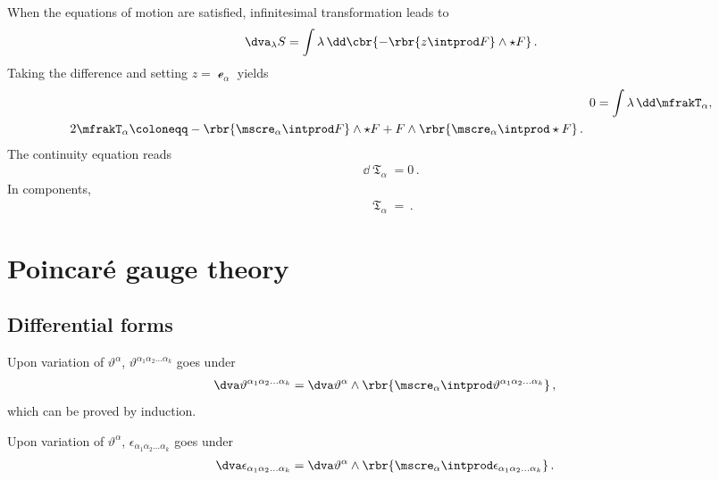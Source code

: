 \documentclass[a4paper]{article}
\begin{document}
When the equations of motion are satisfied, infinitesimal 
transformation leads to
\begin{align}
\dva_{\lambda} S = \int \lambda\,\dd\cbr{-\rbr{z\intprod F}\wedge\star F}\,.
\end{align}
Taking the difference and setting $z = \mscre_{\alpha}$ yields
\begin{align}
0 &= \int \lambda\,\dd \mfrakT_{\alpha}, \\
\begin{split}
2 \mfrakT_{\alpha} &\coloneqq -\rbr{\mscre_{\alpha}\intprod F}\wedge\star F +
	F \wedge\rbr{\mscre_{\alpha}\intprod\star F}\,.
\end{split}
\end{align}
The continuity equation reads
\begin{align}
\dd \mfrakT_{\alpha} = 0\,.
\end{align}
In components,
\begin{align}
\mfrakT_{\alpha} = \,.
\end{align}


\section{Poincaré gauge theory}


\subsection{Differential forms}



Upon variation of $\vartheta^{\alpha}$, $\vartheta^{\alpha_{1}\alpha_{2}\ldots 
\alpha_{k}}$ goes under
\begin{align}
\dva \vartheta^{\alpha_{1}\alpha_{2}\ldots \alpha_{k}} &=
\dva \vartheta^{\alpha} \wedge \rbr{\mscre_{\alpha}\intprod 
	\vartheta^{\alpha_{1}\alpha_{2}\ldots \alpha_{k}}}\,,
\end{align}
which can be proved by induction.

Upon variation of $\vartheta^{\alpha}$, $\epsilon_{\alpha_{1}\alpha_{2}\ldots 
\alpha_{k}}$ goes under \cite[sec.\ A.2]{Muench1998}
\begin{align}
\dva \epsilon_{\alpha_{1}\alpha_{2}\ldots \alpha_{k}} &=
\dva \vartheta^{\alpha} \wedge \rbr{\mscre_{\alpha}\intprod 
	\epsilon_{\alpha_{1}\alpha_{2}\ldots \alpha_{k}}}\,.
\end{align}
\end{document}
